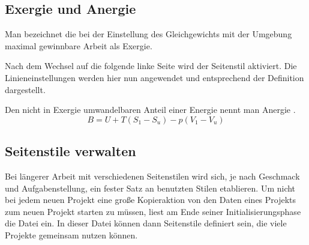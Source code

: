 \begin{Example}
\begin{lstcode}
  \section{Exergie und Anergie}
  Man bezeichnet die bei der Einstellung des 
  Gleichgewichts mit der Umgebung maximal gewinnbare
  Arbeit als Exergie.
\end{lstcode}%
  \begin{XmpTopPage}
        \thinlines{}
  \end{XmpTopPage}

  Nach dem Wechsel auf die folgende linke Seite wird der Seitenstil
   aktiviert.  Die Linieneinstellungen werden hier nun
  angewendet und entsprechend der Definition dargestellt.
\begin{lstcode}
  \pagestyle{mitLinien}
  \renewcommand{\headfont}{\itshape\bfseries}
  Den nicht in Exergie umwandelbaren Anteil einer
  Energie nennt man Anergie .
  \[ B = U + T (S_1 - S_u) - p (V_1 - V_u)\] 
  
\end{lstcode}
  \begin{XmpTopPage}
        \thicklines{}
  \end{XmpTopPage}
\end{Example}
\EndIndexGroup


\subsection{Seitenstile verwalten}\label{sec:scrpage-de.UI.cfgFile}
Bei längerer Arbeit mit verschiedenen Seitenstilen wird sich, je nach
Geschmack und Aufgabenstellung, ein fester Satz an benutzten Stilen
etablieren.
Um nicht bei jedem neuen Projekt eine große Kopieraktion von den Daten
eines Projekts zum neuen Projekt starten zu müssen, liest 
am Ende seiner Initialisierungsphase die Datei  ein.
In dieser Datei können dann Seitenstile definiert sein, die viele
Projekte gemeinsam nutzen können.
%
\EndIndexGroup



